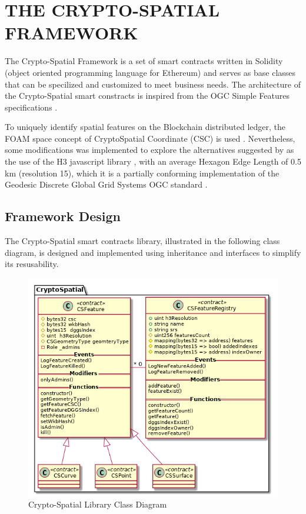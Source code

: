 \documentclass{isprs} %
\begin{document}
\newpage

\section{THE CRYPTO-SPATIAL FRAMEWORK}\label{sec:THE CRYPTO-SPATIAL FRAMEWORK}

The Crypto-Spatial Framework is a set of smart contracts written in Solidity (object oriented programming language for Ethereum) and serves as base classes that can be specilized and customized to meet business needs. The architecture of the Crypto-Spatial smart constracts is inspired from the OGC Simple Features specifications \cite{herring2011opengis}. 

To uniquely identify spatial features on the Blockchain distributed ledger, the FOAM space concept of CryptoSpatial Coordinate (CSC) is used \cite{foamwhitepaper2018}. Nevertheless, some modifications was implemented to explore the alternatives suggested by \cite{ogcdiscuss} as the use of the H3 javascript library \cite{h3}, with an average Hexagon Edge Length  of 0.5 km (resolution 15), which it is a partially conforming implementation of the Geodesic Discrete Global Grid Systems OGC standard \cite{purss2016ogc}.

\subsection{Framework Design}\label{sec:Framework Design}

The Crypto-Spatial smart contracts library, illustrated in the following class diagram, is designed and implemented using inheritance and interfaces to simplify its resusability.

\begin{figure}[ht!]
\begin{center}
		\includegraphics[width=1.0\columnwidth]{figures/class-crypto-spatial-lib.png}
	\caption{Crypto-Spatial Library Class Diagram}
\label{fig:figure_cs_lib_class}
\end{center}
\end{figure}
\end{document}
